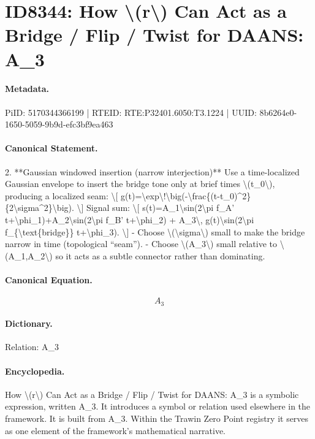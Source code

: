 \section*{ID8344: How \textbackslash{}(r\textbackslash{}) Can Act as a Bridge / Flip / Twist for DAANS: A\_3}
\paragraph{Metadata.}
PiID: 5170344366199 | RTEID: RTE:P32401.6050:T3.1224 | UUID: 8b6264e0-1650-5059-9b9d-efc3bf9ea463

\paragraph{Canonical Statement.}
2. **Gaussian windowed insertion (narrow interjection)** Use a time-localized Gaussian envelope to insert the bridge tone only at brief times \textbackslash{}(t\_0\textbackslash{}), producing a localized seam: \textbackslash{}[ g(t)=\textbackslash{}exp\textbackslash{}!\textbackslash{}big(-\textbackslash{}frac\{(t-t\_0)\textasciicircum{}2\}\{2\textbackslash{}sigma\textasciicircum{}2\}\textbackslash{}big). \textbackslash{}] Signal sum: \textbackslash{}[ s(t)=A\_1\textbackslash{}sin(2\textbackslash{}pi f\_A' t+\textbackslash{}phi\_1)+A\_2\textbackslash{}sin(2\textbackslash{}pi f\_B' t+\textbackslash{}phi\_2) + A\_3\textbackslash{}, g(t)\textbackslash{}sin(2\textbackslash{}pi f\_\{\textbackslash{}text\{bridge\}\} t+\textbackslash{}phi\_3). \textbackslash{}] - Choose \textbackslash{}(\textbackslash{}sigma\textbackslash{}) small to make the bridge narrow in time (topological “seam”). - Choose \textbackslash{}(A\_3\textbackslash{}) small relative to \textbackslash{}(A\_1,A\_2\textbackslash{}) so it acts as a subtle connector rather than dominating.

\paragraph{Canonical Equation.}
\[
A_3
\]

\paragraph{Dictionary.}
Relation: A\_3

\paragraph{Encyclopedia.}
How \textbackslash{}(r\textbackslash{}) Can Act as a Bridge / Flip / Twist for DAANS: A\_3 is a symbolic expression, written A\_3. It introduces a symbol or relation used elsewhere in the framework. It is built from A\_3. Within the Trawin Zero Point registry it serves as one element of the framework's mathematical narrative.
